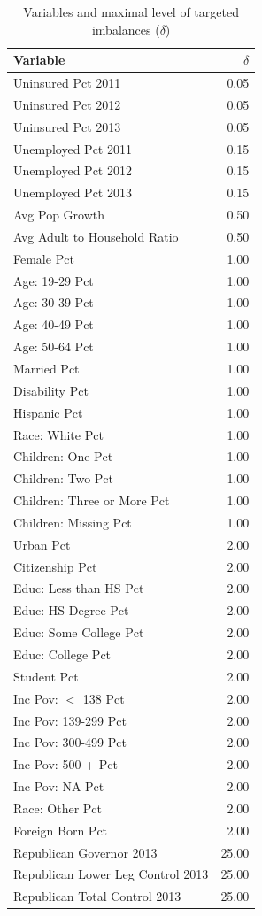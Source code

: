 \begin{table}[ht]
\centering
\caption{Variables and maximal level of targeted imbalances ($\delta$)}
\begin{tabular}{lr}\label{tab:toltable}
Variable & $\delta$ \\ 
  \hline
Uninsured Pct 2011 & 0.05 \\ 
  Uninsured Pct 2012 & 0.05 \\ 
  Uninsured Pct 2013 & 0.05 \\ 
  Unemployed Pct 2011 & 0.15 \\ 
  Unemployed Pct 2012 & 0.15 \\ 
  Unemployed Pct 2013 & 0.15 \\ 
  Avg Pop Growth & 0.50 \\ 
  Avg Adult to Household Ratio & 0.50 \\ 
  Female Pct & 1.00 \\ 
  Age: 19-29 Pct & 1.00 \\ 
  Age: 30-39 Pct & 1.00 \\ 
  Age: 40-49 Pct & 1.00 \\ 
  Age: 50-64 Pct & 1.00 \\ 
  Married Pct & 1.00 \\ 
  Disability Pct & 1.00 \\ 
  Hispanic Pct & 1.00 \\ 
  Race: White Pct & 1.00 \\ 
  Children: One Pct & 1.00 \\ 
  Children: Two Pct & 1.00 \\ 
  Children: Three or More Pct & 1.00 \\ 
  Children: Missing Pct & 1.00 \\ 
  Urban Pct & 2.00 \\ 
  Citizenship Pct & 2.00 \\ 
  Educ: Less than HS Pct & 2.00 \\ 
  Educ: HS Degree Pct & 2.00 \\ 
  Educ: Some College Pct & 2.00 \\ 
  Educ: College Pct & 2.00 \\ 
  Student Pct & 2.00 \\ 
  Inc Pov: $<$ 138 Pct & 2.00 \\ 
  Inc Pov: 139-299 Pct & 2.00 \\ 
  Inc Pov: 300-499 Pct & 2.00 \\ 
  Inc Pov: 500 + Pct & 2.00 \\ 
  Inc Pov: NA Pct & 2.00 \\ 
  Race: Other Pct & 2.00 \\ 
  Foreign Born Pct & 2.00 \\ 
  Republican Governor 2013 & 25.00 \\ 
  Republican Lower Leg Control 2013 & 25.00 \\ 
  Republican Total Control 2013 & 25.00 \\ 
   \hline
\end{tabular}
\end{table}


